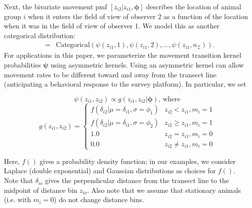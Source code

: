 \documentclass[12pt,fleqn]{article}
\begin{document}
Next, the bivariate movement pmf $[z_{i2}|z_{i1},\boldsymbol{\phi}]$ describes the location of animal group $i$ when it enters the field of view of observer 2 as a function of the location when it was in the field of view of observer 1.  We model this as another categorical distribution:
\begin{eqnarray}
  [z_{i2}|z_{i1},\boldsymbol{\phi}] & = & \text{Categorical} \left( \psi(z_{i1},1),\psi(z_{i1},2),\hdots,\psi(z_{i1},n_\mathcal{Z}) \right).
  \label{eqn:move}
\end{eqnarray}
For applications in this paper, we parameterize the movement transition kernel probabilities $\boldsymbol{\psi}$ using asymmetric kernels.  Using an asymmetric kernel can allow movement rates to be different toward and away from the transect line (anticipating a behavioral response to the survey platform). In particular, we set
\begin{linenomath*}
\begin{equation}
  \psi(z_{i1},z_{i2}) \propto g(z_{i1},z_{i2}|\boldsymbol{\phi}) \text{, where}
  \label{eq:psi}
\end{equation}
\begin{equation}
  g(z_{i1},z_{i2}) = \left\{ \begin{array}{rl}
                                    f(\delta_{i2}|\mu=\delta_{i1},\sigma=\phi_1) & z_{i2}<z_{i1}, m_i = 1 \\
                                    f(\delta_{i2}|\mu=\delta_{i1},\sigma=\phi_2) & z_{i2} \ge z_{i1}, m_i = 1  \\
                                    1.0 & z_{i2}=z_{i1}, m_i=0 \\
                                    0.0 & z_{i2} \ne z_{i1}, m_i=0
                                    \end{array} \right.
  \label{eq:g}
\end{equation}
\end{linenomath*}
Here, $f()$ gives a probability density function; in our examples, we consider Laplace (double exponential) and Gaussian distributions as choices for $f()$. Note that $\delta_{io}$ gives the perpendicular distance from the transect line to the midpoint of distance bin $z_{io}$.  Also note that we assume that stationary animals (i.e. with $m_i=0$) do not change distance bins.
\end{document}

